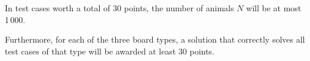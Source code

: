 In test cases worth a total of $30$ points, the number of animals $N$ will be at most 1\,000.

Furthermore, for each of the three board types, a solution that correctly solves all test cases of that type will be awarded at least $30$ points.